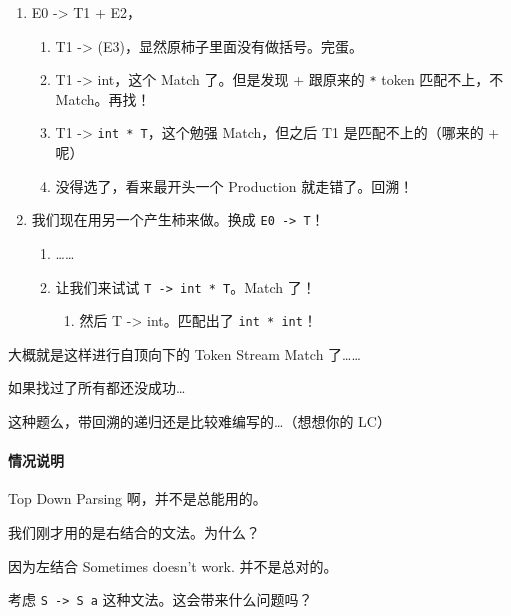 \documentclass[
]{article}
\begin{document}
\begin{enumerate}
\def\labelenumi{\arabic{enumi}.}
\item
  E0 -\textgreater{} T1 + E2，

  \begin{enumerate}
  \def\labelenumii{\arabic{enumii}.}
  \item
    T1 -\textgreater{} (E3)，显然原柿子里面没有做括号。完蛋。
  \item
    T1 -\textgreater{} int，这个 Match 了。但是发现 + 跟原来的
    \texttt{*} token 匹配不上，不 Match。再找！
  \item
    T1 -\textgreater{} \texttt{int\ *\ T}，这个勉强 Match，但之后 T1
    是匹配不上的（哪来的 + 呢）
  \item
    没得选了，看来最开头一个 Production 就走错了。回溯！
  \end{enumerate}
\item
  我们现在用另一个产生柿来做。换成 \texttt{E0\ -\textgreater{}\ T}！

  \begin{enumerate}
  \def\labelenumii{\arabic{enumii}.}
  \item
    \ldots\ldots{}
  \item
    让我们来试试 \texttt{T\ -\textgreater{}\ int\ *\ T}。Match 了！

    \begin{enumerate}
    \def\labelenumiii{\arabic{enumiii}.}
    \item
      然后 T -\textgreater{} int。匹配出了 \texttt{int\ *\ int}！
    \end{enumerate}
  \end{enumerate}
\end{enumerate}

大概就是这样进行自顶向下的 Token Stream Match 了\ldots\ldots{}

如果找过了所有都还没成功\ldots{}

这种题么，带回溯的递归还是比较难编写的\ldots（想想你的 LC）

\hypertarget{header-n42}{%
\paragraph{情况说明}\label{header-n42}}

Top Down Parsing 啊，并不是总能用的。

我们刚才用的是右结合的文法。为什么？

因为左结合 Sometimes doesn't work. 并不是总对的。

考虑 \texttt{S\ -\textgreater{}\ S\ a} 这种文法。这会带来什么问题吗？
\end{document}
